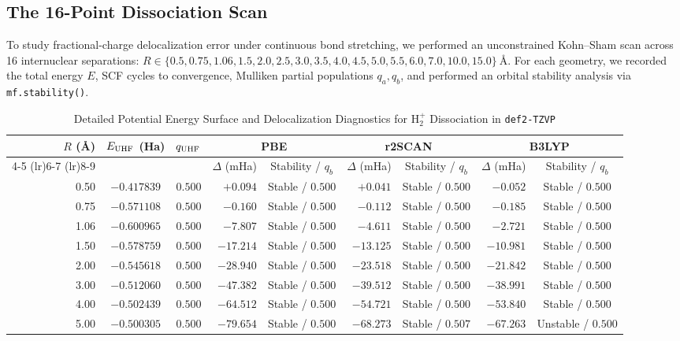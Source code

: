 \documentclass[journal]{IEEEtran}
\begin{document}
\subsection{The 16-Point Dissociation Scan}
To study fractional-charge delocalization error under continuous bond stretching, we performed an unconstrained Kohn--Sham scan across 16 internuclear separations:
$R \in \{0.5, 0.75, 1.06, 1.5, 2.0, 2.5, 3.0, 3.5, 4.0, 4.5, 5.0, 5.5, 6.0, 7.0, 10.0, 15.0\}\ \text{\AA}$.
For each geometry, we recorded the total energy $E$, SCF cycles to convergence, Mulliken partial populations $q_a, q_b$, and performed an orbital stability analysis via \texttt{mf.stability()}.

\begin{table}[t]
\centering
\footnotesize
\caption{Detailed Potential Energy Surface and Delocalization Diagnostics for $\text{H}_2^+$ Dissociation in \texttt{def2-TZVP}}
\label{tab:h2plus_detailed}
\begin{tabular}{rccrcrcrc}
\toprule
$R$ (\AA) & $E_{\rm UHF}$ (Ha) & $q_{\rm UHF}$ & \multicolumn{2}{c}{PBE} & \multicolumn{2}{c}{r2SCAN} & \multicolumn{2}{c}{B3LYP} \\
\cmidrule(lr){4-5} \cmidrule(lr){6-7} \cmidrule(lr){8-9}
 & & & $\Delta$ (mHa) & Stability / $q_b$ & $\Delta$ (mHa) & Stability / $q_b$ & $\Delta$ (mHa) & Stability / $q_b$ \\
\midrule
0.50  & $-0.417839$ & $0.500$ & $+0.094$  & Stable / $0.500$ & $+0.041$  & Stable / $0.500$ & $-0.052$  & Stable / $0.500$ \\
0.75  & $-0.571108$ & $0.500$ & $-0.160$  & Stable / $0.500$ & $-0.112$  & Stable / $0.500$ & $-0.185$  & Stable / $0.500$ \\
1.06  & $-0.600965$ & $0.500$ & $-7.807$  & Stable / $0.500$ & $-4.611$  & Stable / $0.500$ & $-2.721$  & Stable / $0.500$ \\
1.50  & $-0.578759$ & $0.500$ & $-17.214$ & Stable / $0.500$ & $-13.125$ & Stable / $0.500$ & $-10.981$ & Stable / $0.500$ \\
2.00  & $-0.545618$ & $0.500$ & $-28.940$ & Stable / $0.500$ & $-23.518$ & Stable / $0.500$ & $-21.842$ & Stable / $0.500$ \\
3.00  & $-0.512060$ & $0.500$ & $-47.382$ & Stable / $0.500$ & $-39.512$ & Stable / $0.500$ & $-38.991$ & Stable / $0.500$ \\
4.00  & $-0.502439$ & $0.500$ & $-64.512$ & Stable / $0.500$ & $-54.721$ & Stable / $0.500$ & $-53.840$ & Stable / $0.500$ \\
5.00  & $-0.500305$ & $0.500$ & $-79.654$ & Stable / $0.500$ & $-68.273$ & Stable / $0.507$ & $-67.263$ & Unstable / $0.500$ \\

\end{tabular}
\end{table}
\end{document}
